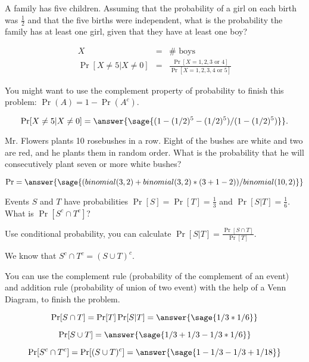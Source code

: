 \documentclass{ximera}
\begin{document}
\begin{problem}
A family has five children. Assuming that the probability of a girl on each birth was $\frac{1}{2}$ and that the five births were independent, what is the probability the family has at least one girl, given that they have at least one boy? 
\begin{hint}
\begin{eqnarray*} X&=& \# \text{ boys } \\ 
\Pr[X \not= 5 | X \not= 0 ] &=&\frac{\Pr[X=1,2,3\text{ or }4]}{\Pr[X=1,2,3,4 \text{ or }5]} \end{eqnarray*} 

You might want to use the complement property of probability to finish this problem: $\Pr(A)=1-\Pr(A^c)$.
\end{hint}

\begin{prompt}
$$\Pr[X \not= 5 | X \not= 0 ]=\answer{\sage{(1-(1/2)^5-(1/2)^5)/(1-(1/2)^5)}}.$$
\end{prompt}

\end{problem}

\begin{problem}
Mr. Flowers plants 10 rosebushes in a row. Eight of the bushes are white and two are red, and he plants them in random order. What is the probability that he will consecutively plant seven or more white bushes? 

\begin{prompt}
$$\Pr=\answer{\sage{(binomial(3,2)+binomial(3,2)*(3+1-2))/binomial(10,2)}}$$
\end{prompt}

\end{problem}

\begin{problem}
 Events $S$ and $T$ have probabilities $\Pr[S] = \Pr[T] =\frac{1}{3}$ and $\Pr[S|T] =\frac{1}{6} $. What is $\Pr[S^c\cap T^c]$?
\begin{hint}
    \item Use conditional probability, you can calculate $\Pr[S|T]=\frac{\Pr[S \cap T]}{\Pr[T]}$.     \item We know that $S^c\cap T^c=(S\cup T)^c$. 
    \item You can use the complement rule (probability of the complement of an event) and addition rule (probability of union of two event) with the help of a Venn Diagram, to finish the problem.
\end{hint}

\begin{prompt}
$$
\Pr[S \cap T]=\Pr[T]\Pr[S|T]=\answer{\sage{1/3*1/6}}
$$ 

$$
\Pr[S \cup T]=\answer{\sage{1/3+1/3-1/3*1/6}}
$$ 

$$
\Pr[S^c \cap T^c]=\Pr[(S \cup T)^c]=\answer{\sage{1-1/3-1/3+1/18}}
$$
\end{prompt}

\end{problem}
\end{document}
